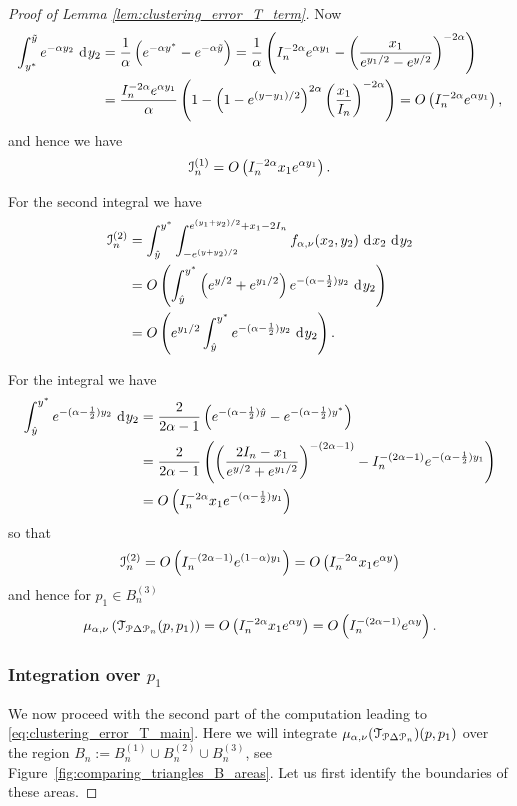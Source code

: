 \begin{proof}[Proof of Lemma \ref{lem:clustering_error_T_term}]
Now 
\begin{align*}
	\int_{y^\ast}^{\tilde{y}}  e^{-\alpha y_2} \operatorname{\, \mathrm{d}\hspace{-1pt}} y_2 
	&= \frac{1}{\alpha}\left(e^{-\alpha y^\ast} - e^{-\alpha \tilde{y}}\right) 
		= \frac{1}{\alpha}\left(I_n^{-2\alpha} e^{\alpha y_1} 
		- \left(\frac{x_1}{e^{y_1/2} - e^{y/2}}\right)^{-2\alpha}\right) \\
	&= \frac{I_n^{-2\alpha} e^{\alpha y_1}}{\alpha}\left(1 - \left(1 - e^{(y - y_1)/2}\right)^{2\alpha}
		\left(\frac{x_1}{I_n}\right)^{-2\alpha}\right) = O\left(I_n^{-2\alpha} e^{\alpha y_1}\right),
\end{align*}
and hence we have
\[
	\mathcal{I}_n^{(1)} = O\left(I_n^{-2\alpha} x_1 e^{\alpha y_1}\right).
\]

For the second integral we have
\begin{align*}
	\mathcal{I}_n^{(2)} &= \int_{\hat{y}}^{y^\ast} \int_{-e^{(y+y_2)/2}}^{e^{(y_1 + y_2)/2} + x_1 - 2I_n} 
		f_{\alpha, \nu}(x_2,y_2)\operatorname{\, \mathrm{d}\hspace{-1pt}} x_2 \operatorname{\, \mathrm{d}\hspace{-1pt}} y_2\\
	&= O\left(\int_{\hat{y}}^{y^\ast} \left(e^{y/2} + e^{y_1/2}\right)e^{-(\alpha - \frac{1}{2})y_2} \operatorname{\, \mathrm{d}\hspace{-1pt}} y_2\right)\\
	&= O\left( e^{y_1/2} \int_{\hat{y}}^{y^\ast}e^{-(\alpha - \frac{1}{2})y_2} \operatorname{\, \mathrm{d}\hspace{-1pt}} y_2\right).
\end{align*}

For the integral we have
\begin{align*}
	\int_{\hat{y}}^{y^\ast}e^{-(\alpha - \frac{1}{2})y_2} \operatorname{\, \mathrm{d}\hspace{-1pt}} y_2
	&= \frac{2}{2\alpha - 1} \left(e^{-(\alpha - \frac{1}{2})\hat{y}} - e^{-(\alpha - \frac{1}{2})y^\ast}\right)\\
	&= \frac{2}{2\alpha - 1}\left(\left(\frac{2I_n - x_1}{e^{y/2} + e^{y_1/2}}\right)^{-(2\alpha - 1)} 
		- I_n^{-(2\alpha - 1)} e^{-(\alpha - \frac{1}{2})y_1}\right)\\
	&= O\left(I_n^{-2\alpha} x_1 e^{-(\alpha - \frac{1}{2})y_1}\right)
\end{align*}
so that
\[
	\mathcal{I}_n^{(2)} = O\left(I_n^{-(2\alpha - 1)} e^{(1-\alpha)y_1}\right) = O\left(I_n^{-2\alpha} x_1 e^{\alpha y}\right)
\]
and hence for $p_1 \in B_n^{(3)}$
\[
	\mu_{\alpha, \nu}\left(\mathcal{T}_{{\mathcal P} \Delta {\mathcal P}_n}(p,p_1)\right) = O\left(I_n^{-2\alpha} x_1 e^{\alpha y}\right)
	= O\left(I_n^{-(2\alpha - 1)} e^{\alpha y}\right).
\]

\subsubsection*{Integration over $p_1$}



We now proceed with the second part of the computation leading to \eqref{eq:clustering_error_T_main}. Here we will integrate $\mu_{\alpha, \nu}(\mathcal{T}_{{\mathcal P} \Delta {\mathcal P}_n})(p,p_1)$ over the region $B_n := B_n^{(1)} \cup B_n^{(2)} \cup B_n^{(3)}$, see Figure~\ref{fig:comparing_triangles_B_areas}. Let us first identify the boundaries of these areas. 


\end{proof}
